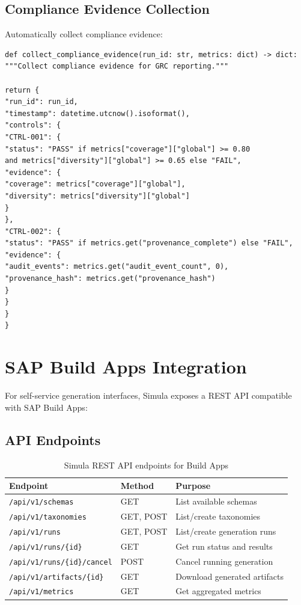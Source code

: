 \documentclass[12pt,a4paper,twoside]{report}
\begin{document}
\subsection{Compliance Evidence Collection}

Automatically collect compliance evidence:

\begin{lstlisting}[language=jsonx,caption={GRC evidence collection}]
def collect_compliance_evidence(run_id: str, metrics: dict) -> dict:
"""Collect compliance evidence for GRC reporting."""

return {
"run_id": run_id,
"timestamp": datetime.utcnow().isoformat(),
"controls": {
"CTRL-001": {
"status": "PASS" if metrics["coverage"]["global"] >= 0.80
and metrics["diversity"]["global"] >= 0.65 else "FAIL",
"evidence": {
"coverage": metrics["coverage"]["global"],
"diversity": metrics["diversity"]["global"]
}
},
"CTRL-002": {
"status": "PASS" if metrics.get("provenance_complete") else "FAIL",
"evidence": {
"audit_events": metrics.get("audit_event_count", 0),
"provenance_hash": metrics.get("provenance_hash")
}
}
}
}
\end{lstlisting}


\section{SAP Build Apps Integration}

For self-service generation interfaces, Simula exposes a REST API compatible
with SAP Build Apps:

\subsection{API Endpoints}

\begin{table}[H]
\centering
\caption{Simula REST API endpoints for Build Apps}
\label{tab:api-endpoints}
\footnotesize
\begin{tabularx}{\textwidth}{@{}l l X@{}}
\toprule
\textbf{Endpoint} & \textbf{Method} & \textbf{Purpose} \\
\midrule
\texttt{/api/v1/schemas} & GET & List available schemas \\
\texttt{/api/v1/taxonomies} & GET, POST & List/create taxonomies \\
\texttt{/api/v1/runs} & GET, POST & List/create generation runs \\
\texttt{/api/v1/runs/\{id\}} & GET & Get run status and results \\
\texttt{/api/v1/runs/\{id\}/cancel} & POST & Cancel running generation \\
\texttt{/api/v1/artifacts/\{id\}} & GET & Download generated artifacts \\
\texttt{/api/v1/metrics} & GET & Get aggregated metrics \\
\bottomrule
\end{tabularx}
\end{table}
\end{document}
